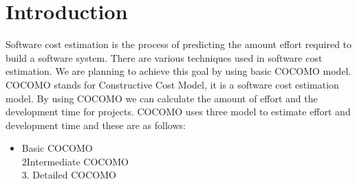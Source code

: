 \documentclass{article}
\begin{document}
\section{Introduction}
Software cost estimation is the process of predicting the amount effort required to build a software system. There are various techniques used in software cost estimation. We are planning to achieve this goal by using basic COCOMO model. COCOMO stands for Constructive Cost Model, it is a software cost estimation model. By using COCOMO we can calculate the amount of effort and the development time for projects. COCOMO uses three model to estimate effort and development time and these are as follows:

\begin{itemize}
 \item Basic COCOMO  \\
2Intermediate COCOMO \\
3. Detailed COCOMO    \\
\end{itemize}
\end{document}

